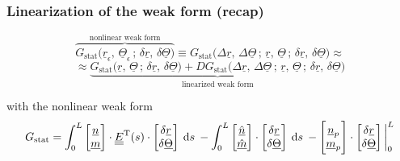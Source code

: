 \begin{frame}
  \frametitle{Linearization of the weak form (recap)}

  \vspace{-0.5em}
  \begin{displaymath}
    \overbrace{
    G_{\text{stat}} \bigl( \underline{r}_{\epsilon} , \, \underline{\Theta}_{\epsilon} \, ; \, \delta \underline{r} , \, \delta \underline{\Theta} \bigr) }^{\text{nonlinear weak form}} \equiv
    G_{\text{stat}} \bigl( \Delta \underline{r} , \, \Delta \underline{\Theta} \, ; \,\underline{r} , \, \underline{\Theta} \, ; \, \delta \underline{r} , \, \delta \underline{\Theta} \bigr) \approx
  \end{displaymath}
  \begin{displaymath}
    \approx
    \underbrace{
    G_{\text{stat}} \bigl( \underline{r} , \, \underline{\Theta} \, ; \, \delta \underline{r} , \, \delta \underline{\Theta} \bigr) +
    DG_{\text{stat}} \bigl( \Delta \underline{r} , \, \Delta \underline{\Theta} \, ; \,\underline{r} , \, \underline{\Theta} \, ; \, \delta \underline{r} , \, \delta \underline{\Theta} \bigr)
    }_{\text{linearized weak form}}
  \end{displaymath}
  
  \vspace{0.5em}
  with the nonlinear weak form
  \begin{displaymath}
    G_{\text{stat}} = 
      \int_0^L
        \begin{bmatrix}
          \underline{n} \\ \underline{m}
        \end{bmatrix}
        \cdot \doubleunderline{E}^{\mathrm{T}}(s) \cdot
        \begin{bmatrix}
          \delta \underline{r} \\ \delta \underline{\Theta}
        \end{bmatrix}
      \: \dif s \:
      - \int_0^L
        \begin{bmatrix}
          \underline{\hat{n}} \\ \underline{\hat{m}}
        \end{bmatrix} \cdot
        \begin{bmatrix}
          \delta \underline{r} \\ \delta \underline{\Theta}
        \end{bmatrix}
      \: \dif s \:
      - \begin{bmatrix}
          \underline{n}_p \\ \underline{m}_p
      \end{bmatrix} \cdot
      \begin{bmatrix}
          \delta \underline{r} \\ \delta \underline{\Theta}
      \end{bmatrix}
      \sVert[3]_0^L
  \end{displaymath}
  

\end{frame}

